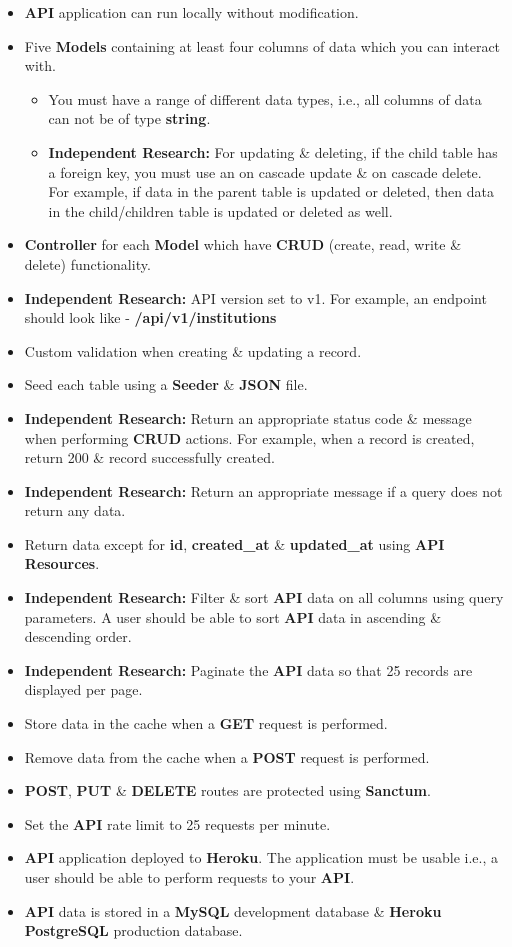 \documentclass{article}
\begin{document}
\begin{itemize}
	\item \textbf{API} application can run locally without modification.
	\item Five \textbf{Models} containing at least four columns of data which you can interact with. 
	\begin{itemize}
    \item You must have a range of different data types, i.e., all columns of data can not be of type \textbf{string}.
    \item \textbf{Independent Research:} For updating \& deleting, if the child table has a foreign key, you must use an on cascade update \& on cascade delete. For example, if data in the parent table is updated or deleted, then data in the child/children table is updated or deleted as well.
  \end{itemize}
	\item \textbf{Controller} for each \textbf{Model} which have \textbf{CRUD} (create, read, write \& delete) functionality. 
	\item \textbf{Independent Research:} API version set to v1. For example, an endpoint should look like - \textbf{/api/v1/institutions}
	\item Custom validation when creating \& updating a record. 
	\item Seed each table using a \textbf{Seeder} \& \textbf{JSON} file.
	\item \textbf{Independent Research:} Return an appropriate status code \& message when performing \textbf{CRUD} actions. For example, when a record is created, return 200 \& record successfully created. 
  \item \textbf{Independent Research:} Return an appropriate message if a query does not return any data.
	\item Return data except for \textbf{id}, \textbf{created\_at} \& \textbf{updated\_at} using \textbf{API Resources}.
	\item \textbf{Independent Research:} Filter \& sort \textbf{API} data on all columns using query parameters. A user should be able to sort \textbf{API} data in ascending \& descending order.
	\item \textbf{Independent Research:} Paginate the \textbf{API} data so that 25 records are displayed per page.
	\item Store data in the cache when a \textbf{GET} request is performed. 
	\item Remove data from the cache when a \textbf{POST} request is performed.  
	\item \textbf{POST}, \textbf{PUT} \& \textbf{DELETE} routes are protected using \textbf{Sanctum}.
	\item Set the \textbf{API} rate limit to 25 requests per minute.
	\item \textbf{API} application deployed to \textbf{Heroku}. The application must be usable i.e., a user should be able to perform requests to your \textbf{API}.
	\item \textbf{API} data is stored in a \textbf{MySQL} development database \& \textbf{Heroku PostgreSQL} production database.	
\end{itemize}
\end{document}
